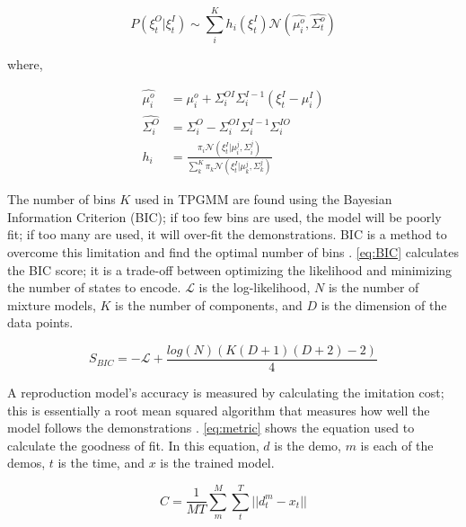 \begin{equation} 
     P(\xi_t^O | \xi_t^I ) \sim \sum_i^K h_i(\xi_t^I) \mathcal{N}( \hat{\mu_i^o}, \hat{\Sigma_t^o}) 
     \label{eq:GMR_Prop} 
\end{equation} 

where, 

\begin{equation} 
    \begin{aligned} 
      \hat{\mu_i^o} &= \mu_i^o + \Sigma_i^{OI}\Sigma_i^{I-1}(\xi_t^I - \mu_i^I)\\ 
      \hat{\Sigma_i^O} &= \Sigma_i^O - \Sigma_i^{OI}\Sigma_i^{I-1} \Sigma^{IO}_i \\ 
       h_{i} &= \frac{\pi_i \mathcal{N}(\xi_t^I | \mu_i^j , \Sigma_i^j )}{ \sum_k^K \pi_k \mathcal{N}(\xi_t^I | \mu_k^j , \Sigma_k^j ) }   
    \end{aligned} 
    \label{eq:GMR_mu} 
\end{equation} 

The number of bins $ K $ used in TPGMM are found using the Bayesian Information Criterion (BIC); if too few bins are used, the model will be poorly fit; if too many are used, it will over-fit the demonstrations. BIC is a method to overcome this limitation and find the optimal number of bins \cite{calinon2007learning}. \autoref{eq:BIC} calculates the BIC score; it is a trade-off between optimizing the likelihood and minimizing the number of states to encode. $\mathcal{L}$ is the log-likelihood, $ N $ is the number of mixture models, $ K $ is the number of components, and $ D $ is the dimension of the data points. 


\begin{equation} 
    S_{BIC} = -\mathcal{L} + \frac{log(N)(K(D+1)(D+2)-2)}{4}  
    \label{eq:BIC} 
\end{equation} 


A reproduction model's accuracy is measured by calculating the imitation cost; this is essentially a root mean squared algorithm that measures how well the model follows the demonstrations \cite{metric}. \autoref{eq:metric} shows the equation used to calculate the goodness of fit. In this equation, $d$ is the demo, $m$ is each of the demos, $t$ is the time, and $x$ is the trained model. 

\begin{equation}
    C = \frac{1}{MT} \sum_m^M{\sum_t^T{ || d^m_t - x_t||}}
    \label{eq:metric}
\end{equation}


